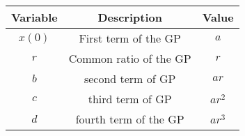\begin{tabular}[12.1pt]{ |c| c| c|}
    \hline
    \textbf{Variable} & \textbf{Description} &\textbf{Value}\\ 
    \hline
    $x(0)$ & First term of the GP & $a$ \\
    \hline 
    $r$ & Common ratio of the GP & $r$ \\
    \hline 
    $b$ & second term of GP & $ar$\\
    \hline
   $c$ & third term of GP & $ar^2$\\
   \hline
   $d$ &fourth term of the GP & $ar^3$\\
   \hline
    \end{tabular}
